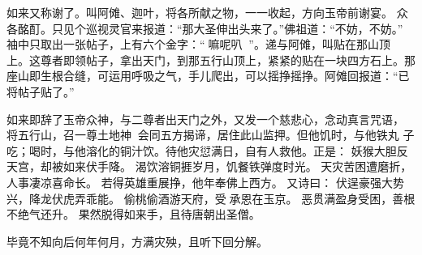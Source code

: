 如来又称谢了。叫阿傩、迦叶，将各所献之物，一一收起，方向玉帝前谢宴。
众各酩酊。只见个巡视灵官来报道：“那大圣伸出头来了。”佛祖道：“不妨，不妨。”
袖中只取出一张帖子，上有六个金字：“嘛呢叭”。递与阿傩，叫贴在那山顶
上。这尊者即领帖子，拿出天门，到那五行山顶上，紧紧的贴在一块四方石上。那
座山即生根合缝，可运用呼吸之气，手儿爬出，可以摇挣摇挣。阿傩回报道：“已
将帖子贴了。”

如来即辞了玉帝众神，与二尊者出天门之外，又发一个慈悲心，念动真言咒语，
将五行山，召一尊土地神，会同五方揭谛，居住此山监押。但他饥时，与他铁丸
子吃；喝时，与他溶化的铜汁饮。待他灾愆满日，自有人救他。正是：
妖猴大胆反天宫，却被如来伏手降。
渴饮溶铜捱岁月，饥餐铁弹度时光。
天灾苦困遭磨折，人事凄凉喜命长。
若得英雄重展挣，他年奉佛上西方。
又诗曰：
伏逞豪强大势兴，降龙伏虎弄乖能。
偷桃偷酒游天府，受承恩在玉京。
恶贯满盈身受困，善根不绝气还升。
果然脱得如来手，且待唐朝出圣僧。

毕竟不知向后何年何月，方满灾殃，且听下回分解。